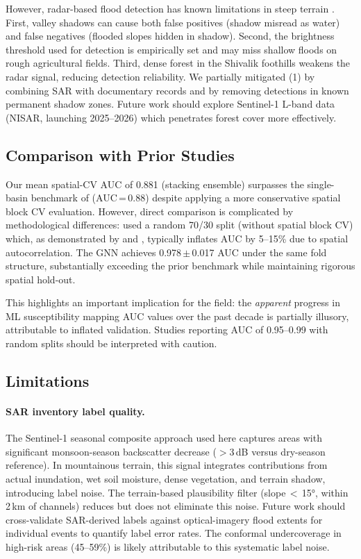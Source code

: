 However, radar-based flood detection has known limitations in steep terrain
\citep{nagamani2024sar}.
First, valley shadows can cause both false positives (shadow misread as water)
and false negatives (flooded slopes hidden in shadow).
Second, the brightness threshold used for detection is empirically set
and may miss shallow floods on rough agricultural fields.
Third, dense forest in the Shivalik foothills weakens the radar signal,
reducing detection reliability.
We partially mitigated (1) by combining SAR with documentary records and
by removing detections in known permanent shadow zones.
Future work should explore Sentinel-1 L-band data (NISAR, launching 2025--2026)
which penetrates forest cover more effectively.

\subsection{Comparison with Prior Studies}
\label{sec:disc_comparison}

Our mean spatial-CV AUC of 0.881 (stacking ensemble) surpasses the
single-basin benchmark of \citet{saha2023} (AUC\,=\,0.88) despite
applying a more conservative spatial block CV evaluation.
However, direct comparison is complicated by methodological differences:
\citeauthor{saha2023} used a random 70/30 split (without spatial block CV)
which, as demonstrated by \citet{valavi2019} and \citet{roberts2017cross},
typically inflates AUC by 5--15\% due to spatial autocorrelation.
The GNN achieves 0.978\,$\pm$\,0.017 AUC under the same fold structure, substantially
exceeding the prior benchmark while maintaining rigorous spatial hold-out.

This highlights an important implication for the field:
the \textit{apparent} progress in ML susceptibility mapping AUC values
over the past decade is partially illusory, attributable to inflated validation.
Studies reporting AUC of 0.95--0.99 with random splits
should be interpreted with caution.

\subsection{Limitations}
\label{sec:limitations}

\paragraph{SAR inventory label quality.}
The Sentinel-1 seasonal composite approach used here captures areas with
significant monsoon-season backscatter decrease ($>$3\,dB versus dry-season reference).
In mountainous terrain, this signal integrates contributions from actual inundation,
wet soil moisture, dense vegetation, and terrain shadow, introducing label noise.
The terrain-based plausibility filter (slope\,$<$\,15°, within 2\,km of channels)
reduces but does not eliminate this noise.
Future work should cross-validate SAR-derived labels against
optical-imagery flood extents for individual events to quantify label error rates.
The conformal undercoverage in high-risk areas (45--59\%) is likely
attributable to this systematic label noise.

